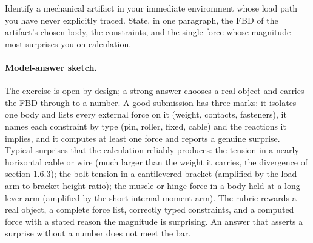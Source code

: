\begin{exercise}
Identify a mechanical artifact in your immediate environment whose
load path you have never explicitly traced. State, in one paragraph,
the FBD of the artifact's chosen body, the constraints, and the
single force whose magnitude most surprises you on calculation.
\paragraph{Model-answer sketch.} The exercise is open by design; a strong
answer chooses a real object and carries the FBD through to a number. A
good submission has three marks: it isolates one body and lists every
external force on it (weight, contacts, fasteners), it names each
constraint by type (pin, roller, fixed, cable) and the reactions it
implies, and it computes at least one force and reports a genuine
surprise. Typical surprises that the calculation reliably produces: the
tension in a nearly horizontal cable or wire (much larger than the
weight it carries, the divergence of section 1.6.3); the bolt tension in
a cantilevered bracket (amplified by the load-arm-to-bracket-height
ratio); the muscle or hinge force in a body held at a long lever arm
(amplified by the short internal moment arm). The rubric rewards a real
object, a complete force list, correctly typed constraints, and a
computed force with a stated reason the magnitude is surprising. An
answer that asserts a surprise without a number does not meet the bar.
\end{exercise}


